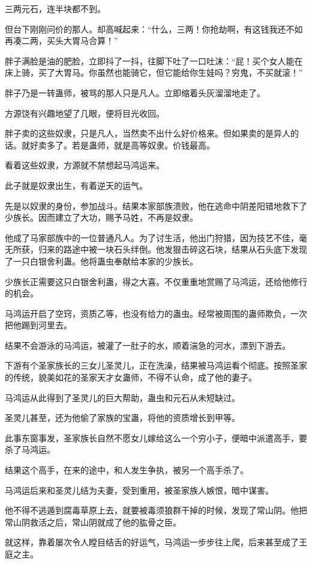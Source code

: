 \begin{this_body}
三两元石，连半块都不到。

但台下刚刚问价的那人。却高喊起来：“什么，三两！你抢劫啊，有这钱我还不如再凑二两，买头大胃马合算！”

胖子满脸是油的肥脸，立即抖了一抖，往脚下吐了一口吐沫：“屁！买个女人能在床上骑，买了大胃马。你虽然也能骑它，但它能给你生娃吗？穷鬼，不买就滚！”

胖子乃是一转蛊师，被骂的那人只是凡人。立即缩着头灰溜溜地走了。

方源饶有兴趣地望了几眼，便将目光收回。

胖子卖的这些奴隶，只是凡人，当然卖不出什么好价格来。但如果卖的是异人的话。就好卖多了。若是蛊师，就是高等奴隶。价钱最高。

看着这些奴隶，方源就不禁想起马鸿运来。

此子就是奴隶出生，有着逆天的运气。

先是以奴隶的身份，参加战斗。结果本家部族溃败，他在逃命中阴差阳错地救下了少族长。因而建立了大功，赐予马姓，不再是奴隶。

他成了马家部族中的一位普通凡人。为了讨生活，他出门狩猎，因为技艺不佳，毫无所获，归来的路途中被一块石头绊倒。他发狠击碎这石块，结果从石头底下发现了一只白银舍利蛊。他将蛊虫奉献给本家的少族长。

少族长正需要这只白银舍利蛊，得之大喜。不仅重重地赏赐了马鸿运，还给他修行的机会。

马鸿运开启了空窍，资质乙等，也没有给力的蛊虫。经常被周围的蛊师欺负，一次把他踢到河里去。

结果不会游泳的马鸿运，被灌了一肚子的水，顺着湍急的河水，漂到下游去。

下游有个圣家族长的三女儿圣灵儿，正在洗澡，结果被马鸿运看个彻底。按照圣家的传统，貌美如花的圣家天才女蛊师，不得不认命，成了他的妻子。

马鸿运从此得到了圣灵儿的巨大帮助，蛊虫和元石从未短缺过。

圣灵儿甚至，还为他偷了家族的宝蛊，将他的资质增长到甲等。

此事东窗事发，圣家族长自然不愿女儿嫁给这么一个穷小子，便暗中派遣高手，要杀了马鸿运。

结果这个高手，在来的途中，和人发生争执，被另一个高手杀了。

马鸿运后来和圣灵儿结为夫妻，受到重用，被圣家族人嫉恨，暗中谋害。

他不得不逃遁到腐毒草原上去，就要被毒须狼群干掉的时候，发现了常山阴。他把常山阴救活之后，常山阴就成了他的肱骨之臣。

就这样，靠着屡次令人瞠目结舌的好运气，马鸿运一步步往上爬，后来甚至成了王庭之主。


\end{this_body}
